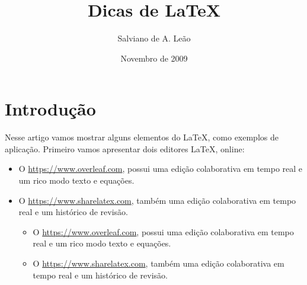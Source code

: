 \documentclass[portuguese,10pt,twocolumn]{article}
\begin{document}
\title{Dicas de \LaTeX{}}
\author{Salviano de A. Leão}
\date{Novembro de 2009}


\section{Introdução}

Nesse artigo vamos mostrar alguns elementos do \LaTeX{}, como exemplos 
de aplicação. Primeiro vamos apresentar dois editores \LaTeX{}, online:
\begin{itemize}
   \item O \url{https://www.overleaf.com}, possui uma edição colaborativa 
   em tempo real e um rico modo texto e equações.
   \item O \url{https://www.sharelatex.com}, também uma edição colaborativa 
   em tempo real e um histórico de revisão.
   
   \begin{itemize}
   \item O \url{https://www.overleaf.com}, \hspace{2.0cm} possui uma edição colaborativa 
   em tempo real e um rico modo texto e equações.
   
   \item O \url{https://www.sharelatex.com}, também uma edição colaborativa 
   em tempo real e um histórico de revisão.
   \end{itemize}	
   
   
\end{itemize}
\end{document}
